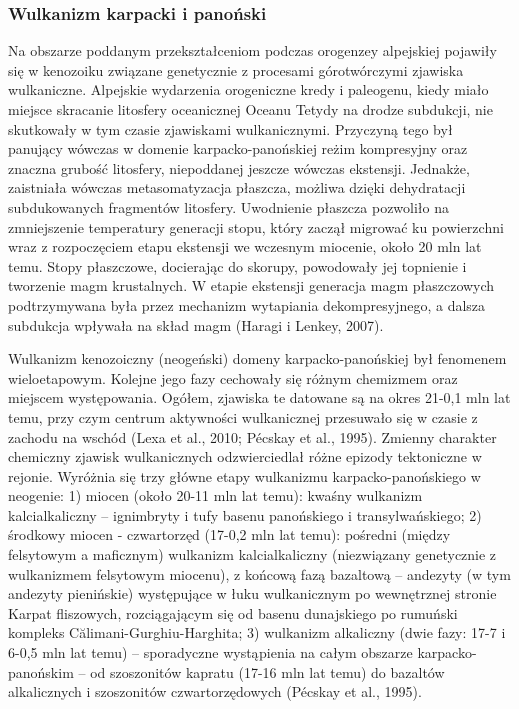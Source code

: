 \documentclass[11.5pt,twoside]{report}
\begin{document}
	\subsubsection{Wulkanizm karpacki i panoński}

Na obszarze poddanym przekształceniom podczas orogenzey alpejskiej pojawiły się w kenozoiku związane genetycznie z procesami górotwórczymi zjawiska wulkaniczne. Alpejskie wydarzenia orogeniczne kredy i paleogenu, kiedy miało miejsce skracanie litosfery oceanicznej Oceanu Tetydy na drodze subdukcji, nie skutkowały w tym czasie zjawiskami wulkanicznymi. Przyczyną tego był panujący wówczas w domenie karpacko-panońskiej reżim kompresyjny oraz znaczna grubość litosfery, niepoddanej jeszcze wówczas ekstensji. Jednakże, zaistniała wówczas metasomatyzacja płaszcza, możliwa dzięki dehydratacji subdukowanych fragmentów litosfery. Uwodnienie płaszcza pozwoliło na zmniejszenie temperatury generacji stopu, który zaczął migrować ku powierzchni wraz z rozpoczęciem etapu ekstensji we wczesnym miocenie, około 20 mln lat temu. Stopy płaszczowe, docierając do skorupy, powodowały jej topnienie i tworzenie magm krustalnych. W etapie ekstensji generacja magm płaszczowych podtrzymywana była przez mechanizm wytapiania dekompresyjnego, a dalsza subdukcja wpływała na skład magm (Haragi i Lenkey, 2007).


Wulkanizm kenozoiczny (neogeński) domeny karpacko-panońskiej był fenomenem wieloetapowym. Kolejne jego fazy cechowały się różnym chemizmem oraz miejscem występowania. Ogółem, zjawiska te datowane są na okres 21-0,1 mln lat temu, przy czym centrum aktywności wulkanicznej przesuwało się w czasie z zachodu na wschód (Lexa et al., 2010; P\'{e}cskay et al., 1995). Zmienny charakter chemiczny zjawisk wulkanicznych odzwierciedlał różne epizody tektoniczne w rejonie. Wyróżnia się trzy główne etapy wulkanizmu karpacko-panońskiego w neogenie: 1) miocen (około 20-11 mln lat temu): kwaśny wulkanizm kalcialkaliczny -- ignimbryty i tufy basenu panońskiego i transylwańskiego; 2) środkowy miocen - czwartorzęd (17-0,2 mln lat temu): pośredni (między felsytowym a maficznym) wulkanizm kalcialkaliczny (niezwiązany genetycznie z wulkanizmem felsytowym miocenu), z końcową fazą bazaltową -- andezyty (w tym andezyty pienińskie) występujące w łuku wulkanicznym po wewnętrznej stronie Karpat fliszowych, rozciągającym się od basenu dunajskiego po rumuński kompleks Călimani-Gurghiu-Harghita; 3) wulkanizm alkaliczny (dwie fazy: 17-7 i 6-0,5 mln lat temu) -- sporadyczne wystąpienia na całym obszarze karpacko-panońskim -- od szoszonitów kapratu (17-16 mln lat temu) do bazaltów alkalicznych i szoszonitów czwartorzędowych (P\'{e}cskay et al., 1995).
  
\end{document}
